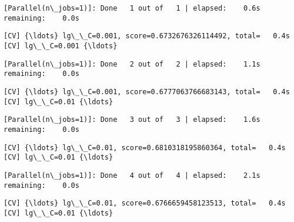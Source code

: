 \documentclass[11pt]{article}
\begin{document}
    \begin{Verbatim}[commandchars=\\\{\}]
[Parallel(n\_jobs=1)]: Done   1 out of   1 | elapsed:    0.6s remaining:    0.0s

    \end{Verbatim}

    \begin{Verbatim}[commandchars=\\\{\}]
[CV] {\ldots} lg\_\_C=0.001, score=0.6732676326114492, total=   0.4s
[CV] lg\_\_C=0.001 {\ldots}

    \end{Verbatim}

    \begin{Verbatim}[commandchars=\\\{\}]
[Parallel(n\_jobs=1)]: Done   2 out of   2 | elapsed:    1.1s remaining:    0.0s

    \end{Verbatim}

    \begin{Verbatim}[commandchars=\\\{\}]
[CV] {\ldots} lg\_\_C=0.001, score=0.6777063766683143, total=   0.4s
[CV] lg\_\_C=0.01 {\ldots}

    \end{Verbatim}

    \begin{Verbatim}[commandchars=\\\{\}]
[Parallel(n\_jobs=1)]: Done   3 out of   3 | elapsed:    1.6s remaining:    0.0s

    \end{Verbatim}

    \begin{Verbatim}[commandchars=\\\{\}]
[CV] {\ldots} lg\_\_C=0.01, score=0.6810318195860364, total=   0.4s
[CV] lg\_\_C=0.01 {\ldots}

    \end{Verbatim}

    \begin{Verbatim}[commandchars=\\\{\}]
[Parallel(n\_jobs=1)]: Done   4 out of   4 | elapsed:    2.1s remaining:    0.0s

    \end{Verbatim}

    \begin{Verbatim}[commandchars=\\\{\}]
[CV] {\ldots} lg\_\_C=0.01, score=0.6766659458123513, total=   0.4s
[CV] lg\_\_C=0.01 {\ldots}

    \end{Verbatim}
\end{document}
